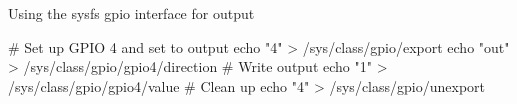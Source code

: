 \begin{frame}
   {Using the sysfs gpio interface for output}
   \begin{raw}
# Set up GPIO 4 and set to output
echo "4" > /sys/class/gpio/export
echo "out" > /sys/class/gpio/gpio4/direction
# Write output
echo "1" > /sys/class/gpio/gpio4/value
# Clean up
echo "4" > /sys/class/gpio/unexport
   \end{raw}
\end{frame}

\cprotect\note{


}

